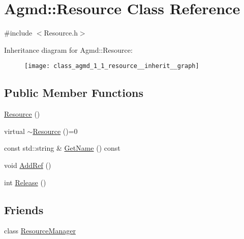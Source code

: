 \hypertarget{class_agmd_1_1_resource}{\section{Agmd\+:\+:Resource Class Reference}
\label{class_agmd_1_1_resource}
}


{\ttfamily \#include $<$Resource.\+h$>$}



Inheritance diagram for Agmd\+:\+:Resource\+:\nopagebreak
\begin{figure}[H]
\begin{center}
\leavevmode
\texttt{[image: class\_agmd\_1\_1\_resource\_\_inherit\_\_graph]}
\end{center}
\end{figure}
\subsection*{Public Member Functions}
\begin{DoxyCompactItemize}
\item 
\hyperlink{class_agmd_1_1_resource_ad1a1ebf28667534167d63378f44df14c}{Resource} ()
\item 
virtual \hyperlink{class_agmd_1_1_resource_a271d2785706024b0b60d1af505531804}{$\sim$\+Resource} ()=0
\item 
const std\+::string \& \hyperlink{class_agmd_1_1_resource_a2cf166241cfc5a5f2bef049acf3be3c0}{Get\+Name} () const 
\item 
void \hyperlink{class_agmd_1_1_resource_aebaaa40478a5ccd12aca39fd05de5f03}{Add\+Ref} ()
\item 
int \hyperlink{class_agmd_1_1_resource_ae6941d1560e4f1643d7264831cc2751e}{Release} ()
\end{DoxyCompactItemize}
\subsection*{Friends}
\begin{DoxyCompactItemize}
\item 
class \hyperlink{class_agmd_1_1_resource_a54c1252abc87a78a301e6b6984470408}{Resource\+Manager}
\end{DoxyCompactItemize}


